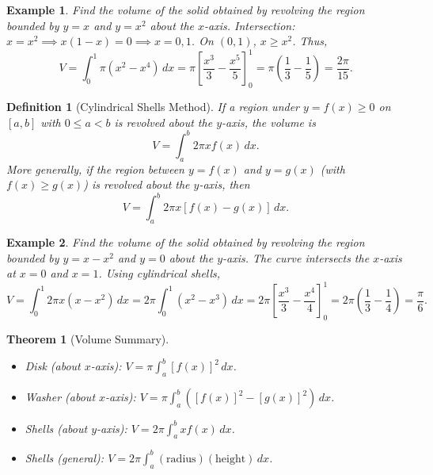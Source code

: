 \documentclass[11pt,a4paper]{article}
\newtheorem{example}{Example}
\newtheorem{theorem}{Theorem}
\newtheorem{definition}{Definition}
\begin{document}
\begin{example}
Find the volume of the solid obtained by revolving the region bounded by $y = x$ and $y = x^2$ about the $x$-axis.
Intersection: $x = x^2 \implies x(1 - x) = 0 \implies x = 0, 1$. On $(0, 1)$, $x \geq x^2$. Thus,
\[
V = \int_0^1 \pi (x^2 - x^4) \, dx = \pi \left[ \frac{x^3}{3} - \frac{x^5}{5} \right]_0^1 = \pi \left( \frac{1}{3} - \frac{1}{5} \right) = \frac{2\pi}{15}.
\]
\end{example}
\begin{definition}[Cylindrical Shells Method]
If a region under $y = f(x) \geq 0$ on $[a, b]$ with $0 \leq a < b$ is revolved about the $y$-axis, the volume is
\[
V = \int_a^b 2\pi x f(x) \, dx.
\]
More generally, if the region between $y = f(x)$ and $y = g(x)$ (with $f(x) \geq g(x)$) is revolved about the $y$-axis, then
\[
V = \int_a^b 2\pi x [f(x) - g(x)] \, dx.
\]
\end{definition}
\begin{center}
\end{center}
\begin{example}
Find the volume of the solid obtained by revolving the region bounded by $y = x - x^2$ and $y = 0$ about the $y$-axis.
The curve intersects the $x$-axis at $x = 0$ and $x = 1$. Using cylindrical shells,
\[
V = \int_0^1 2\pi x (x - x^2) \, dx = 2\pi \int_0^1 (x^2 - x^3) \, dx = 2\pi \left[ \frac{x^3}{3} - \frac{x^4}{4} \right]_0^1 = 2\pi \left( \frac{1}{3} - \frac{1}{4} \right) = \frac{\pi}{6}.
\]
\end{example}
\begin{theorem}[Volume Summary]
\begin{itemize}
\item Disk (about $x$-axis): $V = \pi \int_a^b [f(x)]^2 \, dx$.
\item Washer (about $x$-axis): $V = \pi \int_a^b ([f(x)]^2 - [g(x)]^2) \, dx$.
\item Shells (about $y$-axis): $V = 2\pi \int_a^b x f(x) \, dx$.
\item Shells (general): $V = 2\pi \int_a^b (\text{radius})(\text{height}) \, dx$.
\end{itemize}
\end{theorem}
\end{document}
